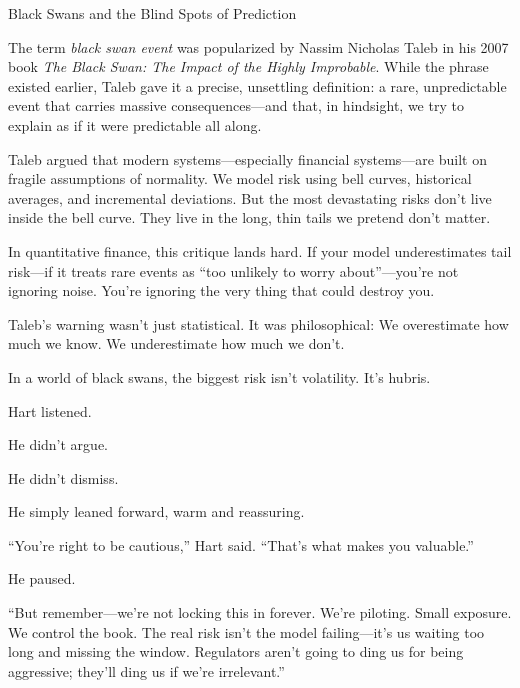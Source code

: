 \begin{HistoricalSidebar}{Black Swans and the Blind Spots of Prediction}

  The term \textit{black swan event} was popularized by Nassim Nicholas Taleb in his 2007 book \textit{The Black Swan: The Impact of the Highly Improbable}. While the phrase existed earlier, Taleb gave it a precise, unsettling definition: a rare, unpredictable event that carries massive consequences—and that, in hindsight, we try to explain as if it were predictable all along.

  \medskip
  
  Taleb argued that modern systems—especially financial systems—are built on fragile assumptions of normality. We model risk using bell curves, historical averages, and incremental deviations. But the most devastating risks don’t live inside the bell curve. They live in the long, thin tails we pretend don’t matter.
  
  \medskip
  
  In quantitative finance, this critique lands hard. If your model underestimates tail risk—if it treats rare events as “too unlikely to worry about”—you’re not ignoring noise. You’re ignoring the very thing that could destroy you.

  \medskip
  
  Taleb’s warning wasn’t just statistical. It was philosophical:  
  We overestimate how much we know.  
  We underestimate how much we don’t.

  \medskip
  
  In a world of black swans, the biggest risk isn’t volatility.  
  It’s hubris.
  
\end{HistoricalSidebar}

\medskip

Hart listened.

He didn’t argue.

He didn’t dismiss.

He simply leaned forward, warm and reassuring.

“You’re right to be cautious,” Hart said.  
“That’s what makes you valuable.”

He paused.

“But remember—we’re not locking this in forever. We’re piloting. Small exposure. We control the book. The real risk isn’t the model failing—it’s us waiting too long and missing the window. Regulators aren’t going to ding us for being aggressive; they’ll ding us if we’re irrelevant.”

